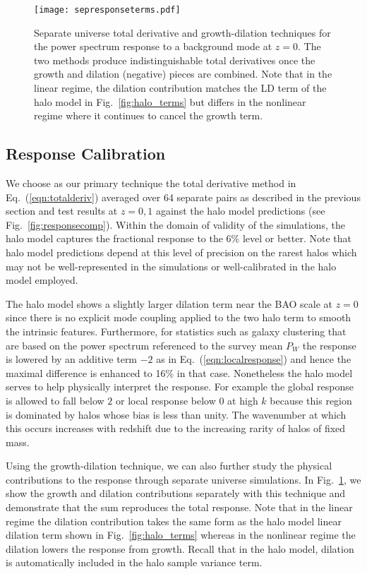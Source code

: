 \documentclass[prd,twocolumn,amsmath,amssymb,floatfix,superscriptaddress]{revtex4-1}
\begin{document}
\begin{figure}[tb]
    \centering
    \texttt{[image: sepresponseterms.pdf]}
    \caption{\footnotesize Separate universe total derivative and growth-dilation techniques for the power spectrum response to a background mode at $z=0$.   The two methods produce indistinguishable total derivatives once the growth and dilation (negative) pieces are combined.  Note that in the linear regime, the dilation contribution matches the LD term of
    the halo model in Fig.~\ref{fig:halo_terms} but differs in the nonlinear regime where it continues to cancel the growth term.}
    \label{fig:sim_terms}
\end{figure}

\subsection{Response Calibration}
\label{sec:sepres}

We choose as our primary technique the total derivative method in Eq.~(\ref{eqn:totalderiv}) averaged over  64 separate pairs as described in the previous section and test results
at $z=0,1$ against the halo model predictions (see Fig.~\ref{fig:responsecomp}).   Within
the domain of validity of the simulations, the halo model captures the
fractional response to the 6\% level or better.    
{Note that halo model predictions depend at this level of precision on 
the rarest halos which may not be well-represented in the simulations or well-calibrated
in the halo model employed.
}




The halo model shows a slightly larger  dilation term near the BAO scale at $z=0$
since there is no explicit mode coupling applied to the two halo term to smooth the intrinsic
features.   
Furthermore, for statistics such as galaxy clustering that are based on the power spectrum referenced to the survey
mean $P_W$ the response is lowered by an additive term $-2$ as in Eq.~(\ref{eqn:localresponse}) and hence the maximal difference is enhanced to  
16\%  in that case.   
Nonetheless the halo model serves to help physically interpret the
response.   For example the global response is allowed to fall below $2$ or local response below $0$ at high $k$ because
this region is dominated by halos whose  bias is less than unity.  The wavenumber at which this
occurs increases with redshift due to the increasing rarity of halos of fixed mass.


Using the growth-dilation technique, we can also further study the physical contributions to the response through separate universe simulations.   In Fig.~\ref{fig:sim_terms}, we show 
the growth and dilation contributions separately with this technique and demonstrate that 
the sum reproduces the total response.   Note that in the linear regime the dilation contribution
takes the same form as the halo model linear dilation term shown in Fig.~\ref{fig:halo_terms}
whereas in the nonlinear regime the dilation lowers the response from growth.   Recall that
in the halo model, dilation is automatically included in 
the halo sample variance term.  
\end{document}
